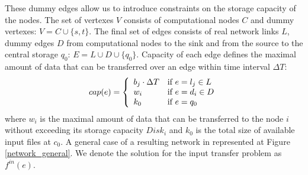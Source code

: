 \documentclass[english]{ddny}
\begin{document}
 These dummy edges allow us to introduce constraints
on the storage capacity of the nodes. The set of vertexes $V$ consists of
computational nodes $C$ and dummy vertexes: $V= C \cup \{s,t\}$. The final set
of edges consists of real network links $L$, dummy edges $D$ from
computational nodes to the sink and from the source to the central storage
$q_{0}$: $E= L \cup D \cup \{q_{0}\}$. Capacity of each edge defines the
maximal amount of data that can be transferred over an edge within time
interval $\Delta T$: 
%
\begin{equation} 
\label{edge_cap} 
cap(e) = \left\{
\begin{array}{l l} 
b_{j} \cdot \Delta T & \text{if }e = l_{j} \in L \\ w_{i} &
\text{if } e = d_{i} \in D\\ k_{0} & \text{if } e = q_{0} 
\end{array} \right.
\end{equation} 
%
where $w_{i}$ is the maximal amount of data that can be
transferred to the node $i$ without exceeding its storage capacity $Disk_{i}$
and $k_{0}$ is the total size of available input files at $c_{0}$. A general case of a resulting network in represented at Figure \ref{network_general}. We denote
the solution for the input transfer problem as $f^{in}(e)$.
\end{document}
